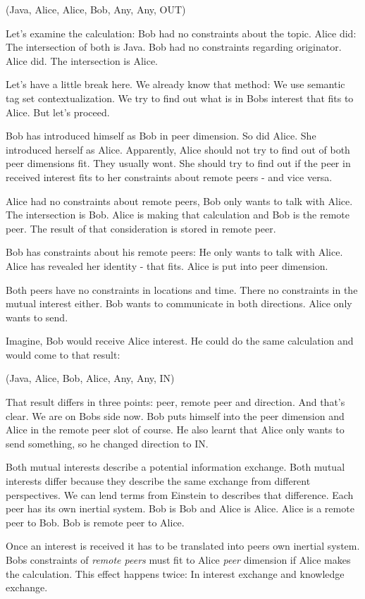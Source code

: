 (Java, Alice, Alice, Bob, Any, Any, OUT)

Let's examine the calculation: Bob had no constraints about the topic. Alice did: The intersection of both is Java. Bob had no constraints regarding originator. Alice did. The intersection is Alice.

Let's have a little break here. We already know that method: We use semantic tag set contextualization. We try to find out what is in Bobs interest that fits to Alice. But let's proceed.

Bob has introduced himself as Bob in peer dimension. So did Alice. She introduced herself as Alice. Apparently, Alice should not try to find out of both peer dimensions fit. They usually wont. She should try to find out if the peer in received interest fits to her constraints about remote peers - and vice versa.

Alice had no constraints about remote peers, Bob only wants to talk with Alice. The intersection is Bob. Alice is making that calculation and Bob is the remote peer. The result of that consideration is stored in remote peer.

Bob has constraints about his remote peers: He only wants to talk with Alice. Alice has revealed her identity - that fits. Alice is put into peer dimension.

Both peers have no constraints in locations and time. There no constraints in the mutual interest either. Bob wants to communicate in both directions. Alice only wants to send.

Imagine, Bob would receive Alice interest. He could do the same calculation and would come to that result:

(Java, Alice, Bob, Alice, Any, Any, IN)

That result differs in three points: peer, remote peer and direction. And that's clear. We are on Bobs side now. Bob puts himself into the peer dimension and Alice in the remote peer slot of course. He also learnt that Alice only wants to send something, so he changed direction to IN.

Both mutual interests describe a potential information exchange. Both mutual interests differ because they describe the same exchange from different perspectives. We can lend terms from Einstein to describes that difference. Each peer has its own inertial system. Bob is Bob and Alice is Alice. Alice is a remote peer to Bob. Bob is remote peer to Alice. 

Once an interest is received it has to be translated into peers own inertial system. Bobs constraints of {\it remote peers} must fit to Alice {\it peer} dimension if Alice makes the calculation. This effect happens twice: In interest exchange and knowledge exchange.

